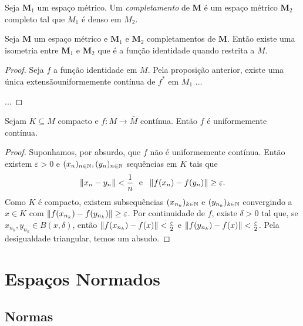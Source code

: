 \begin{defi}
Seja $\bm M_1$  um espaço métrico. Um \emph{completamento} de $\bm M$ é um espaço métrico $\bm M_2$ completo tal que $M_1$ é denso em $M_2$.
\end{defi}

\begin{prop}
Seja $\bm M$ um espaço métrico e $\bm M_1$ e $\bm M_2$ completamentos de $\bm M$. Então existe uma isometria entre $\bm M_1$ e $\bm M_2$ que é a função identidade quando restrita a $M$.
\end{prop}
\begin{proof}
	Seja $f$ a função identidade em $M$. Pela proposição anterior, existe uma única extensãouniformemente contínua de $f^*$ em $M_1$ ...
	
	...
\end{proof}


\begin{prop}
Sejam $K \subseteq M$ compacto e $f: M \to \bar M$ contínua. Então $f$ é uniformemente contínua.
\end{prop}
\begin{proof}
Suponhamos, por absurdo, que $f$ não é uniformemente contínua. Então existem $\varepsilon > 0$ e $(x_n)_{n \in \mathbb{N}},(y_n)_{n \in \mathbb{N}}$ sequências em $K$ tais que
	\begin{equation*}
	\left\Vert{x_n - y_n}\right\Vert < \frac{1}{n} \text{\ \ e\ \ } \left\Vert{f(x_n)-f(y_n)}\right\Vert \geq \varepsilon.
	\end{equation*}
Como $K$ é compacto, existem subsequências $(x_{n_k})_{k \in \mathbb{N}}$  e $(y_{n_k})_{k \in \mathbb{N}}$ convergindo a $x \in K$ com $\left\Vert{f(x_{n_k})-f(y_{n_k})}\right\Vert \geq \varepsilon$. Por continuidade de $f$, existe $\delta > 0$ tal que, se $x_{n_k},y_{n_k} \in B(x,\delta)$, então $\left\Vert{f(x_{n_k})-f(x)}\right\Vert < \frac{\varepsilon}{2}$ e $\left\Vert{f(y_{n_k})-f(x)}\right\Vert < \frac{\varepsilon}{2}$. Pela desigualdade triangular, temos um absudo.
\end{proof}



\chapter{Espaços Normados}

\section{Normas}

